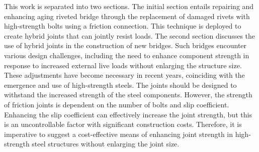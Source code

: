 This work is separated into two sections. The initial section entails repairing and enhancing aging riveted bridge through the replacement of damaged rivets with high-strength bolts using a friction connection. This technique is deployed to create hybrid joints that can jointly resist loads. The second section discusses the use of hybrid joints in the construction of new bridges. Such bridges encounter various design challenges, including the need to enhance component strength in response to increased external live loads without enlarging the structure size. These adjustments have become necessary in recent years, coinciding with the emergence and use of high-strength steels. The joints should be designed to withstand the increased strength of the steel components. However, the strength of friction joints is dependent on the number of bolts and slip coefficient. Enhancing the slip coefficient can effectively increase the joint strength, but this is an uncontrollable factor with significant construction costs. Therefore, it is imperative to suggest a cost-effective means of enhancing joint strength in high-strength steel structures without enlarging the joint size.

